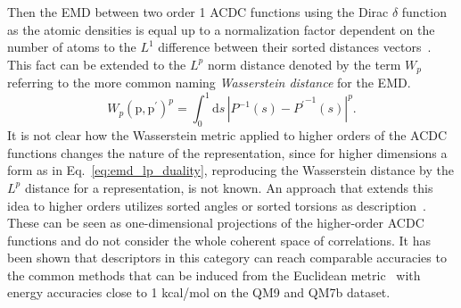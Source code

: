 Then the EMD between two order 1 ACDC functions using the Dirac $\delta$ function as the atomic densities is equal up to a normalization factor dependent on the number of atoms to the $L^1$ difference between their sorted distances vectors~\cite{will+19jcp}.
This fact can be extended to the $L^p$ norm distance denoted by the term $W_p$ referring to the more common naming \emph{Wasserstein distance} for the EMD.
\begin{equation}
  \label{eq:emd_lp_duality}
  W_p(\textrm{p}, \textrm{p}^\prime)^p=\int_0^1\mathrm{d}{s}\,\left|P^{-1}(s) -{P^{\prime}}^{-1}(s)\right|^p.
\end{equation}
It is not clear how the Wasserstein metric applied to higher orders of the ACDC functions changes the nature of the representation, since for higher dimensions a form as in Eq.~\eqref{eq:emd_lp_duality}, reproducing the Wasserstein distance by the $L^p$ distance for a representation, is not known.
An approach that extends this idea to higher orders utilizes sorted angles or sorted torsions as description~\cite{huang2016communication}.
These can be seen as one-dimensional projections of the higher-order ACDC functions and do not consider the whole coherent space of correlations.
It has been shown that descriptors in this category can reach comparable accuracies to the common methods that can be induced from the Euclidean metric~\cite{barker2016localized,huang2016communication} with energy accuracies close to 1 kcal/mol on the QM9 and QM7b dataset. %

